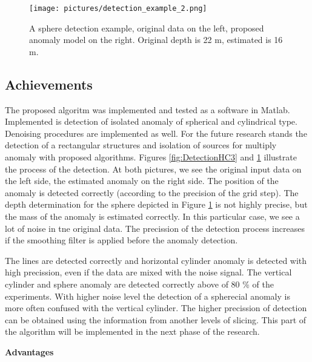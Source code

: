 \documentclass[FM]{tulthesis}
\begin{document}
\begin{figure}[ht]
\renewcommand{\figurename}{Figure}
\centerline{\texttt{[image: pictures/detection\_example\_2.png]}}
\caption[Gravimetry - Example of detection]{A sphere detection example, original data on the left, proposed anomaly model on the right. Original depth is 22 m, estimated is 16 m.}
\label{fig:DetectionSphere}
\end{figure}


\subsection{Achievements} \label{sec:GraviAchievments}

 The proposed algoritm was implemented and tested as a software in Matlab. Implemented is detection of isolated anomaly of spherical and cylindrical type. Denoising procedures are implemented as well. For the future research stands the detection of a rectangular structures and isolation of sources for multiply anomaly with proposed algorithms. Figures \ref{fig:DetectionHC3} and \ref{fig:DetectionSphere} illustrate the process of the detection. At both pictures, we see the original input data on the left side, the estimated anomaly on the right side. The position of the anomaly is detected correctly (according to the precision of the grid step). The depth determination for the sphere depicted in Figure \ref{fig:DetectionSphere} is not highly precise, but the mass of the anomaly is estimated correctly. In this particular case, we see a lot of noise in tne original data. The precission of the detection process increases if the smoothing filter is applied before the anomaly detection.

The lines are detected correctly and horizontal cylinder anomaly is detected with high precission, even if the data are mixed with the noise signal. The vertical cylinder and sphere anomaly are detected correctly above of 80 \% of the experiments. With higher noise level the detection of a spherecial anomaly is more often confused with the vertical cylinder. The higher precission of detection can be obtained using the information from another levels of slicing. This part of the algorithm will be implemented in the next phase of the research.

\textbf{Advantages}
\end{document}
